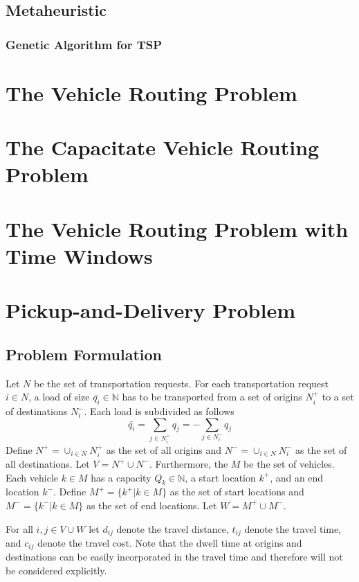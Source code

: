 			\section{Metaheuristic}
				\subsection{Genetic Algorithm for TSP}


		\chapter{The Vehicle Routing Problem}

		\chapter{The Capacitate Vehicle Routing Problem}

		\chapter{The Vehicle Routing Problem with Time Windows}

		\chapter{Pickup-and-Delivery Problem}\label{chp:PDP}
			\section{Problem Formulation}
				Let $N$ be the set of transportation requests. For each transportation request $i \in N$, a load of size $\bar{q_i} \in \mathbb{N}$ has to be transported from a set of origins $N_i^+$ to a set of destinations $N_i^-$. Each load is subdivided as follows
				\begin{equation}
					\bar{q_i} = \sum_{j \in N_i^+} q_j = -\sum_{j \in N_i^-} q_j
				\end{equation}
				Define $N^+ = \cup_{i \in N} N_i^+$ as the set of all origins and $N^- = \cup_{i \in N}N_i^-$ as the set of all destinations. Let $V = N^+ \cup N^-$. Furthermore, the $M$ be the set of vehicles. Each vehicle $k \in M$ has a capacity $Q_k \in \mathbb{N}$, a start location $k^+$, and an end location $k^-$. Define $M^+ = \{k^+|k\in M\}$ as the set of start locations and $M^- = \{k^-|k\in M\}$ as the set of end locations. Let $W = M^+ \cup M^-$.

				For all $i, j \in V\cup W$ let $d_{ij}$ denote the travel distance, $t_{ij}$ denote the travel time, and $c_{ij}$ denote the travel cost. Note that the dwell time at origins and destinations can be easily incorporated in the travel time and therefore will not be considered explicitly.

